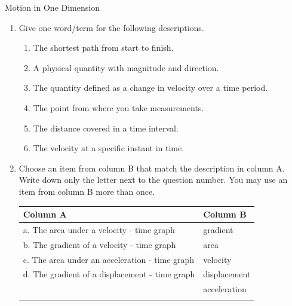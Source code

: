\begin{eocexercises}{Motion in One Dimension}
            \nopagebreak
      \label{m38796*id81294}\begin{enumerate}[noitemsep, label=\textbf{\arabic*}. ] 
            \label{m38796*uid172}\item Give one word/term for the following descriptions.
\label{m38796*id81309}\begin{enumerate}[noitemsep, label=\textbf{\alph*}. ] 
            \label{m38796*uid173}\item The shortest path from start to finish.
\label{m38796*uid174}\item A physical quantity with magnitude and direction.
\label{m38796*uid175}\item The quantity defined as a change in velocity over a time period.
\label{m38796*uid176}\item The point from where you take measurements.
\label{m38796*uid177}\item The distance covered in a time interval.
\label{m38796*uid178}\item The velocity at a specific instant in time.
\end{enumerate}
                \label{m38796*uid179}\item Choose an item from column B that match the description in column A. Write down only the letter next to the question number. You may use an item from column B more than once.
          \begin{table}[H]
        \begin{center}
      \label{m38796*uid180}
    \noindent
      \begin{tabular}{|l|l|}\hline
        Column A &
        Column B \\ \hline
        a. The area under a velocity - time graph &
        gradient \\ \hline
        b. The gradient of a velocity - time graph &
        area \\ \hline
        c. The area under an acceleration - time graph &
        velocity \\ \hline
        d. The gradient of a displacement - time graph &
        displacement \\ \hline
         &
        acceleration \\ \hline
         &

\end{tabular}
\end{center}
\end{table}
\end{enumerate}
\end{eocexercises}
